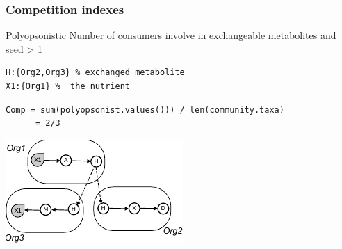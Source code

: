 \documentclass[8pt,usenames,dvipsnames]{beamer}
\begin{document}
\begin{frame}[fragile]
\frametitle{Competition  indexes}
\begin{minipage}{0.5\textwidth}

\begin{exampleblock}{Polyopsonistic}
Number of consumers involve in exchangeable metabolites and seed > 1
\end{exampleblock}{}

\begin{lstlisting}[mathescape=True]
H:{Org2,Org3} % exchanged metabolite
X1:{Org1} %  the nutrient
\end{lstlisting}

\begin{lstlisting}[mathescape=True]
 Comp = sum(polyopsonist.values())) / len(community.taxa)
      = 2/3
\end{lstlisting}

%

\end{minipage}%
\hspace{0.5cm}
\hfill
\begin{minipage}{0.4\textwidth}
\includegraphics[width=\textwidth]{figures/exchanged.pdf}
\end{minipage}


\end{frame}
\end{document}
